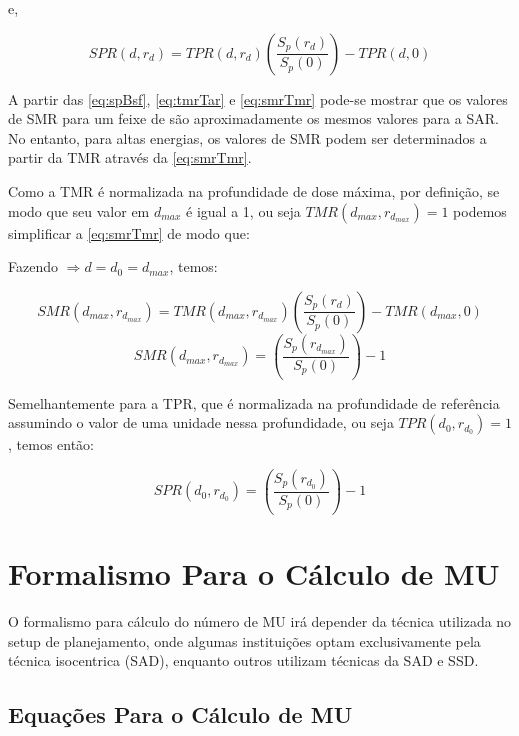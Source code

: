 \documentclass[11pt,a4paper]{article}
\begin{document}
    e,

        \begin{equation}
            SPR (d,r_d) = TPR(d,r_d) \left(\frac{S_p(r_d)}{S_p(0)}\right) - TPR(d,0)
            \label{eq:sprTpr}
        \end{equation}

        A partir das \ref{eq:spBsf}, \ref{eq:tmrTar} e \ref{eq:smrTmr} pode-se mostrar que os valores de SMR para um feixe de  são aproximadamente os mesmos valores para a SAR. No entanto, para altas energias, os valores de SMR  podem ser determinados a partir da TMR através da \ref{eq:smrTmr}.

        Como a TMR é normalizada na profundidade de dose máxima, por definição, se modo que seu valor em $d_{max}$ é igual a 1, ou seja $TMR(d_{max}, r_{d_{max}}) = 1$ podemos simplificar a \ref{eq:smrTmr} de modo que:

            Fazendo $\Rightarrow d = d_0 = d_{max}$, temos:

            $$
                SMR(d_{max}, r_{d_{max}}) = TMR(d_{max}, r_{d_{max}}) \left(\frac{S_p(r_d)}{S_p(0)}\right) - TMR(d_{max},0)
            $$    
            \begin{equation}
                SMR(d_{max}, r_{d_{max}}) = \left(\frac{S_p(r_{d_{max}})}{S_p(0)}\right) - 1
                \label{eq:smrSp}
            \end{equation}

        Semelhantemente para a TPR, que é normalizada na profundidade de referência assumindo o valor de uma unidade nessa profundidade, ou seja $TPR(d_0,r_{d_0}) = 1$, temos então:

        \begin{equation}
            SPR(d_{0}, r_{d_{0}}) = \left(\frac{S_p(r_{d_0})}{S_p(0)}\right) - 1
            \label{eq:sprSp}
        \end{equation}



    \section{Formalismo Para o Cálculo de MU}

        O formalismo para cálculo do número de MU irá depender da técnica utilizada no setup de planejamento, onde algumas instituições optam exclusivamente pela técnica isocentrica (SAD), enquanto outros utilizam técnicas da SAD e SSD.

    \subsection{Equações Para o Cálculo de MU}
\end{document}
